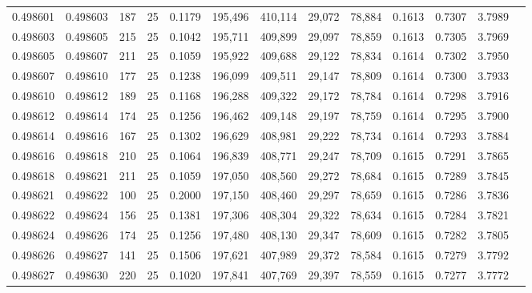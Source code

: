 \begin{tabular}{rrrrrrrrrrrrr}
0.498601 & 0.498603 & 187 &  25 &                                     0.1179 & 195,496 & 410,114 &  29,072 &  78,884 & 0.1613 & 0.7307 & 3.7989 \\
0.498603 & 0.498605 & 215 &  25 &                                     0.1042 & 195,711 & 409,899 &  29,097 &  78,859 & 0.1613 & 0.7305 & 3.7969 \\
0.498605 & 0.498607 & 211 &  25 &                                     0.1059 & 195,922 & 409,688 &  29,122 &  78,834 & 0.1614 & 0.7302 & 3.7950 \\
0.498607 & 0.498610 & 177 &  25 &                                     0.1238 & 196,099 & 409,511 &  29,147 &  78,809 & 0.1614 & 0.7300 & 3.7933 \\
0.498610 & 0.498612 & 189 &  25 &                                     0.1168 & 196,288 & 409,322 &  29,172 &  78,784 & 0.1614 & 0.7298 & 3.7916 \\
0.498612 & 0.498614 & 174 &  25 &                                     0.1256 & 196,462 & 409,148 &  29,197 &  78,759 & 0.1614 & 0.7295 & 3.7900 \\
0.498614 & 0.498616 & 167 &  25 &                                     0.1302 & 196,629 & 408,981 &  29,222 &  78,734 & 0.1614 & 0.7293 & 3.7884 \\
0.498616 & 0.498618 & 210 &  25 &                                     0.1064 & 196,839 & 408,771 &  29,247 &  78,709 & 0.1615 & 0.7291 & 3.7865 \\
0.498618 & 0.498621 & 211 &  25 &                                     0.1059 & 197,050 & 408,560 &  29,272 &  78,684 & 0.1615 & 0.7289 & 3.7845 \\
0.498621 & 0.498622 & 100 &  25 &                                     0.2000 & 197,150 & 408,460 &  29,297 &  78,659 & 0.1615 & 0.7286 & 3.7836 \\
0.498622 & 0.498624 & 156 &  25 &                                     0.1381 & 197,306 & 408,304 &  29,322 &  78,634 & 0.1615 & 0.7284 & 3.7821 \\
0.498624 & 0.498626 & 174 &  25 &                                     0.1256 & 197,480 & 408,130 &  29,347 &  78,609 & 0.1615 & 0.7282 & 3.7805 \\
0.498626 & 0.498627 & 141 &  25 &                                     0.1506 & 197,621 & 407,989 &  29,372 &  78,584 & 0.1615 & 0.7279 & 3.7792 \\
0.498627 & 0.498630 & 220 &  25 &                                     0.1020 & 197,841 & 407,769 &  29,397 &  78,559 & 0.1615 & 0.7277 & 3.7772 \\

\end{tabular}
